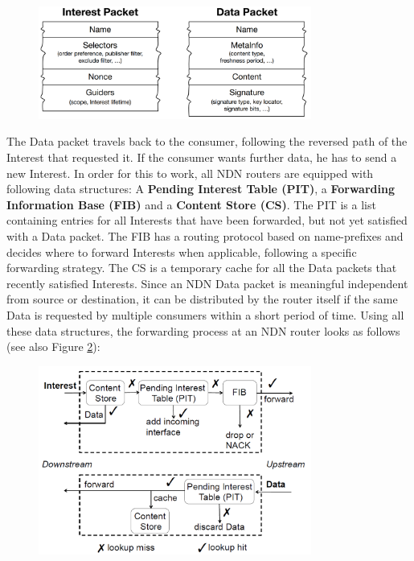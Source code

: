  \begin{figure}[ht]
 	\centering
 	\includegraphics[width=0.8\textwidth]{figures/Packets_in_the_NDN_Architecture.png}
 	\label{fig:fundamentals:NDNPackagestructure}
 \end{figure}
 
 The Data packet travels back to the consumer, following the reversed path of the Interest that requested it. If the consumer wants further data, he has to send a new Interest. In order for this to work, all NDN routers are equipped with following data structures: A \textbf{Pending Interest Table (PIT)}, a \textbf{Forwarding Information Base (FIB)} and a \textbf{Content Store (CS)}. The PIT is a list containing entries for all Interests that have been forwarded, but not yet satisfied with a Data packet. The FIB has a routing protocol based on name-prefixes and decides where to forward Interests when applicable, following a specific forwarding strategy. The CS is a temporary cache for all the Data packets that recently satisfied Interests. Since an NDN Data packet is meaningful independent from source or destination, it can be distributed by the router itself if the same Data is requested by multiple consumers within a short period of time. Using all these data structures, the forwarding process at an NDN router looks as follows (see also Figure \ref{fig:fundamentals:NDNForwardingProcess}):

 \begin{figure}[ht]
 	\centering
 	\includegraphics[width=0.8\textwidth]{figures/Forwarding_process_at_NDN_Router.png}
 	\label{fig:fundamentals:NDNForwardingProcess}
 \end{figure}


